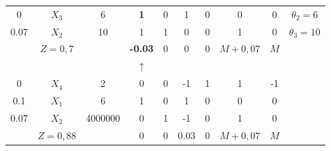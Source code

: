 \begin{tabular}{cccccccccc}
    0       & \textcolor[rgb]{ 1,  0,  0}{\boldmath{}\textbf{$X_3$}\unboldmath{}} & 6       & \textbf{1} & 0       & 1       & 0       & 0       & 0       & \boldmath{}\textbf{$\theta_2 = 6$}\unboldmath{} \\
    0.07    & $X_2$   & 10      & 1       & 1       & 0       & 0       & 1       & 0       & $\theta_3 = 10$ \bigstrut[b]\\
    \hline
            & $Z=0,7$ &         & \textcolor[rgb]{ 0,  .439,  .753}{\textbf{-0.03}} & 0       & 0       & 0       & $M+0,07$ & $M$     &  \bigstrut\\
    \hline
    \hline
            &         &         & $\uparrow$ &         &         &         &         &         &  \bigstrut\\
    \hline
    \hline
    0       & $X_4$   & 2       & 0       & 0       & -1      & 1       & 1       & -1      &  \bigstrut[t]\\
    0.1     & $X_1$   & 6       & 1       & 0       & 1       & 0       & 0       & 0       &  \\
    0.07    & $X_2$   & 4000000 & 0       & 1       & -1      & 0       & 1       & 0       &  \bigstrut[b]\\
\cline{1-9}            & $Z=0,88$ &         & 0       & 0       & 0.03    & 0       & $M+0,07$ & $M$     &  \bigstrut\\
\cline{1-9}    \end{tabular}%

